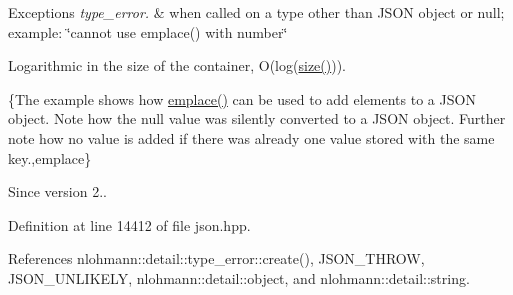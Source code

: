 \begin{DoxyExceptions}{Exceptions}
{\em type\+\_\+error.} & when called on a type other than J\+S\+ON object or null; example\+: {\ttfamily \char`\"{}cannot use emplace() with number\char`\"{}}\\
\hline
\end{DoxyExceptions}
Logarithmic in the size of the container, O(log({\ttfamily \hyperlink{classnlohmann_1_1basic__json_a25e27ad0c6d53c01871c5485e1f75b96}{size()}})).

\{The example shows how {\ttfamily \hyperlink{classnlohmann_1_1basic__json_a5338e282d1d02bed389d852dd670d98d}{emplace()}} can be used to add elements to a J\+S\+ON object. Note how the {\ttfamily null} value was silently converted to a J\+S\+ON object. Further note how no value is added if there was already one value stored with the same key.,emplace\}

\begin{DoxySince}{Since}
version 2.. 
\end{DoxySince}


Definition at line 14412 of file json.\+hpp.



References nlohmann\+::detail\+::type\+\_\+error\+::create(), J\+S\+O\+N\+\_\+\+T\+H\+R\+OW, J\+S\+O\+N\+\_\+\+U\+N\+L\+I\+K\+E\+LY, nlohmann\+::detail\+::object, and nlohmann\+::detail\+::string.


